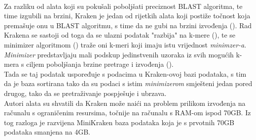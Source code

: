 \documentclass[times, utf8, zavrsni]{fer}
\begin{document}
\\Za razliku od alata koji su pokušali poboljšati preciznost BLAST algoritma, te time izgubili na brzini, Kraken je jedan od rijetkih alata koji postiže točnost koja premašuje onu u BLAST algoritmu, s time da ne gubi na brzini izvođenja (\cite{Kraken}). Rad Krakena se sastoji od toga da se ulazni podatak "razbija" na k-mere (\cite{jellyfish}), te se minimizer algoritmom (\cite{minim}) traže oni k-meri koji imaju istu vrijednost \textit{minimzer-a}.\\\textit{Minimizer} predstavljaju mali podskup jedinstvenih uzoraka iz svih mogućih k-mera s ciljem poboljšanja brzine pretrage i izvođenja (\cite{minim}).\\ Tada se taj podatak uspoređuje s podacima u Kraken-ovoj bazi podataka, s tim da je baza sortirana tako da su podaci s istim \textit{minimizerom} smješteni jedan pored drugog, tako da se pretraživanje  pospješuje i ubrzava.
\\Autori alata su shvatili da Kraken može naići na problem prilikom izvođenja na računalu s ograničenim resursima, točnije na računalu s RAM-om ispod 70GB. Iz tog razloga je razvijena MiniKraken baza podataka koja je s prvotnih 70GB podataka smanjena na 4GB.
\end{document}
